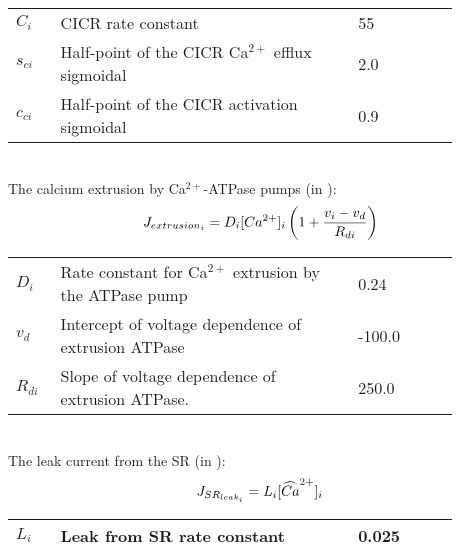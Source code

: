 %
\begin{table}[h!]
\centering
\begin{tabular}{| p{0.09\linewidth} | >{\footnotesize} p{0.6\linewidth} | >{\footnotesize} p{0.17\linewidth} | >{\footnotesize} p{0.02\linewidth} |}
\arrayrulecolor{lightgrey}\hline
$C_{i}$      			& CICR rate constant									& 55 \uMs		& \cite{Koenigsberger2006} \\
$s_{ci}$				& Half-point of the CICR Ca$^{2+}$ efflux sigmoidal			& 2.0 \uM		& \cite{Koenigsberger2006} \\
$c_{ci}$				& Half-point of the CICR activation sigmoidal			& 0.9 \uM		& \cite{Koenigsberger2006} \\
\hline
\end{tabular}
\label{tab:JCICRi}
\end{table}
\\
%
The calcium extrusion by Ca$^{2+}$-ATPase pumps (in \uMs):
\begin{equation} \label{eq:Jextrusioni}
J_{extrusion_{i}} = D_{i}[Ca^{2+}]_{i}   \left( 1+ \frac{v_{i}-v_{d}}{R_{di}}\right)
\end{equation}
%
\begin{table}[h!]
\centering
\begin{tabular}{| p{0.09\linewidth} | >{\footnotesize} p{0.6\linewidth} | >{\footnotesize} p{0.17\linewidth} | >{\footnotesize} p{0.02\linewidth} |}
\arrayrulecolor{lightgrey}\hline
$D_{i}$      			& Rate constant for Ca$^{2+}$ extrusion by the ATPase pump		 & 0.24	\pers			& \cite{Koenigsberger2005} \\
$v_{d}$					& Intercept of voltage dependence of extrusion ATPase			 & -100.0 \mV			& \cite{Koenigsberger2006} \\
$R_{di}$				& Slope of voltage dependence of extrusion ATPase.				 & 250.0 \mV			& \cite{Koenigsberger2006} \\
\hline
\end{tabular}
\label{tab:Jextrusioni}
\end{table}
\\
%
The leak current from the SR (in \uMs):
\begin{equation} \label{eq:JSRleaki}
J_{SR_{leak_{i}}} = L_{i}[\widehat{Ca}^{2+}]_{i}
\end{equation}
\begin{table}[h!]
\centering
\begin{tabular}{| p{0.09\linewidth} | >{\footnotesize} p{0.6\linewidth} | >{\footnotesize} p{0.17\linewidth} | >{\footnotesize} p{0.02\linewidth} |}
\arrayrulecolor{lightgrey}\hline
$L_{i}$      			& Leak from SR rate constant						 & 0.025 \pers				& \cite{Koenigsberger2006} \\
\hline
\end{tabular}
\label{tab:Jleaki}
\end{table}
